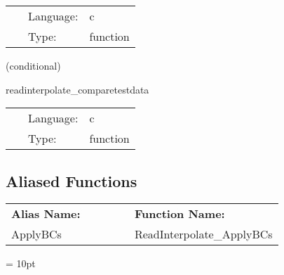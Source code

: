 \hspace{5mm}

 \begin{tabular*}{160mm}{cll} 
~ & Language:  & c \\ 
~ & Type:  & function \\ 
\end{tabular*} 


\vspace{5mm}

   (conditional) 

\hspace{5mm} readinterpolate\_comparetestdata 

\hspace{5mm}{\it compare to polynomial test data } 


\hspace{5mm}

 \begin{tabular*}{160mm}{cll} 
~ & Language:  & c \\ 
~ & Type:  & function \\ 
\end{tabular*} 


\subsection*{Aliased Functions}

\hspace{5mm}

 \begin{tabular*}{160mm}{ll} 

{\bf Alias Name:} ~~~~~~~ & {\bf Function Name:} \\ 
ApplyBCs & ReadInterpolate\_ApplyBCs \\ 
\end{tabular*} 



\vspace{5mm}\parskip = 10pt 
